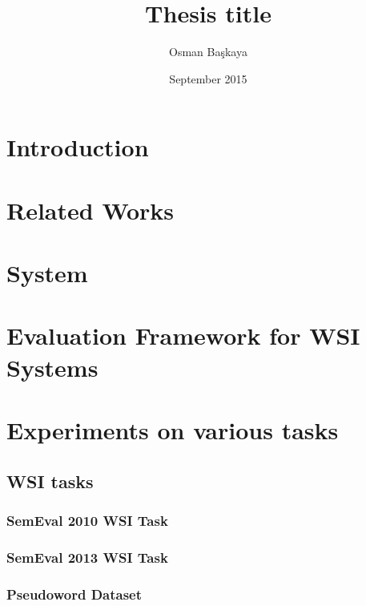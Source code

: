 \documentclass[a4paper, 12pt]{book}
\title{Thesis title}
\author{Osman Başkaya}
\date{September 2015}
\begin{document}
\maketitle




\tableofcontents

\chapter{Introduction}

\chapter{Related Works}

\chapter{System}


\chapter{Evaluation Framework for WSI Systems}


\chapter{Experiments on various tasks}

\section{WSI tasks}
\subsection{SemEval 2010 WSI Task}\label{subsection:semeval10}

\subsection{SemEval 2013 WSI Task}\label{subsection:semeval13}

\subsection{Pseudoword Dataset}\label{subsection:pseudoset}
\end{document}
